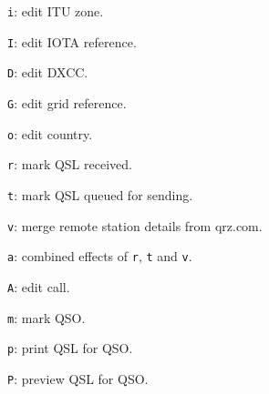 \documentclass[10pt,landscape,a4paper]{article}
\newcommand{\code}{\texttt}
\begin{document}
\begin{multicols*}{3}
\code{i}: edit ITU zone.

\code{I}: edit IOTA reference.

\code{D}: edit DXCC.

\code{G}: edit grid reference.

\code{o}: edit country.

\code{r}: mark QSL received.

\code{t}: mark QSL queued for sending.

\code{v}: merge remote station details from qrz.com.

\code{a}: combined effects of \code{r}, \code{t} and \code{v}.

\code{A}: edit call.

\code{m}: mark QSO.

\code{p}: print QSL for QSO.

\code{P}: preview QSL for QSO.

\end{multicols*}
\end{document}
